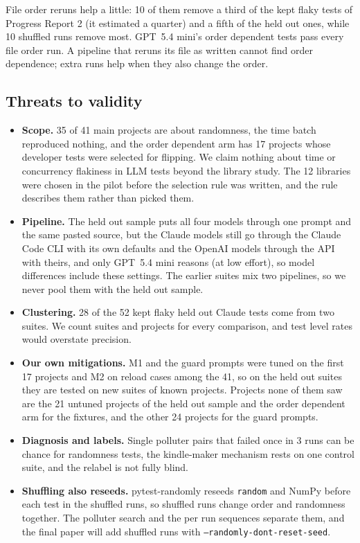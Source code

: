 File order reruns help a little: 10 of them remove a third of the kept flaky tests of Progress Report 2 (it estimated a quarter) and a fifth of the held out ones, while 10 shuffled runs remove most. GPT~5.4 mini's order dependent tests pass every file order run. A pipeline that reruns its file as written cannot find order dependence; extra runs help when they also change the order.

\subsection{Threats to validity}
\label{sec:threats3}
\begin{itemize}
\item \textbf{Scope.} 35 of 41 main projects are about randomness, the time batch reproduced nothing, and the order dependent arm has 17 projects whose developer tests were selected for flipping. We claim nothing about time or concurrency flakiness in LLM tests beyond the library study. The 12 libraries were chosen in the pilot before the selection rule was written, and the rule describes them rather than picked them.
\item \textbf{Pipeline.} The held out sample puts all four models through one prompt and the same pasted source, but the Claude models still go through the Claude Code CLI with its own defaults and the OpenAI models through the API with theirs, and only GPT~5.4 mini reasons (at low effort), so model differences include these settings. The earlier suites mix two pipelines, so we never pool them with the held out sample.
\item \textbf{Clustering.} 28 of the 52 kept flaky held out Claude tests come from two suites. We count suites and projects for every comparison, and test level rates would overstate precision.
\item \textbf{Our own mitigations.} M1 and the guard prompts were tuned on the first 17 projects and M2 on reload cases among the 41, so on the held out suites they are tested on new suites of known projects. Projects none of them saw are the 21 untuned projects of the held out sample and the order dependent arm for the fixtures, and the other 24 projects for the guard prompts.
\item \textbf{Diagnosis and labels.} Single polluter pairs that failed once in 3 runs can be chance for randomness tests, the kindle-maker mechanism rests on one control suite, and the relabel is not fully blind.
\item \textbf{Shuffling also reseeds.} pytest-randomly reseeds \texttt{random} and NumPy before each test in the shuffled runs, so shuffled runs change order and randomness together. The polluter search and the per run sequences separate them, and the final paper will add shuffled runs with \texttt{--randomly-dont-reset-seed}.

\end{itemize}
